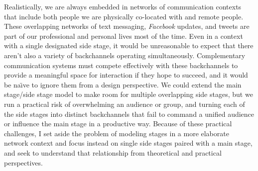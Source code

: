 Realistically, we are always embedded in networks of communication contexts that include both people we are physically co-located with and remote people. These overlapping networks of text messaging, \emph{Facebook} updates, and tweets are part of our professional and personal lives most of the time. Even in a context with a single designated side stage, it would be unreasonable to expect that there aren't also a variety of backchannels operating simultaneously. Complementary communication systems must compete effectively with these backchannels to provide a meaningful space for interaction if they hope to succeed, and it would be na\"{\i}ve to ignore them from a design perspective. We could extend the main stage/side stage model to make room for multiple overlapping side stages, but we run a practical risk of overwhelming an audience or group, and turning each of the side stages into distinct backchannels that fail to command a unified audience or influence the main stage in a productive way. Because of these practical challenges, I set aside the problem of modeling stages in a more elaborate network context and focus instead on single side stages paired with a main stage, and seek to understand that relationship from theoretical and practical perspectives.










